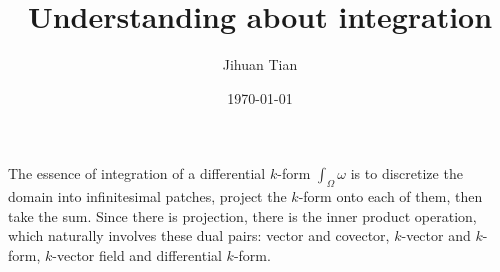 \documentclass[11pt]{article}
\author{Jihuan Tian}
\date{\today}
\title{Understanding about integration}
\begin{document}
\maketitle
\setcounter{tocdepth}{5}
\tableofcontents

The essence of integration of a differential \(k\)-form \(\int_{\Omega} \omega\) is to discretize the domain into infinitesimal patches, project the \(k\)-form onto each of them, then take the sum. Since there is projection, there is the inner product operation, which naturally involves these dual pairs: vector and covector, \(k\)-vector and \(k\)-form, \(k\)-vector field and differential \(k\)-form.
\end{document}
